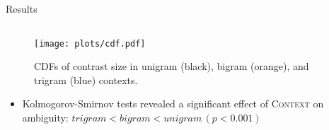 \documentclass[final]{beamer}
\begin{document}
\begin{frame}[t]
\begin{columns}[t]
\begin{column}{0.85\paperwidth}
\begin{block}{Results}
\begin{columns}[t,totalwidth=0.85\paperwidth] %

\begin{column}{0.4\paperwidth} %

\begin{figure}
\texttt{[image: plots/cdf.pdf]}
\caption{CDFs of contrast size in unigram (black), bigram (orange), and trigram (blue) contexts.}
\end{figure}

\begin{itemize}
  \item Kolmogorov-Smirnov tests revealed a significant effect of \textsc{Context} on ambiguity: $trigram < bigram < unigram\, (p < 0.001)$
\end{itemize}
\vspace{1cm}


\end{column} %

\begin{column}{0.4\paperwidth} %



\end{column}
\end{columns}
\end{block}
\end{column}
\end{columns}
\end{frame}
\end{document}
